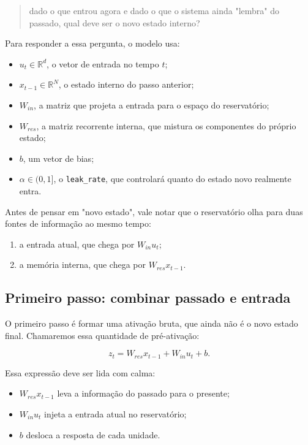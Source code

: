 \documentclass[12pt]{article}
\providecommand{\tightlist}{%
              \setlength{\itemsep}{0pt}\setlength{\parskip}{0pt}}
\begin{document}
\begin{quote}
dado o que entrou agora e dado o que o sistema ainda "lembra" do passado, qual deve ser o novo estado interno?
\end{quote}

Para responder a essa pergunta, o modelo usa:

\begin{itemize}
\tightlist
\item
  \(u_t \in \mathbb{R}^d\), o vetor de entrada no tempo \(t\);
\item
  \(x_{t-1} \in \mathbb{R}^N\), o estado interno do passo anterior;
\item
  \(W_{in}\), a matriz que projeta a entrada para o espaço do reservatório;
\item
  \(W_{res}\), a matriz recorrente interna, que mistura os componentes do próprio estado;
\item
  \(b\), um vetor de bias;
\item
  \(\alpha \in (0,1]\), o \texttt{leak\_rate}, que controlará quanto do estado novo realmente entra.
\end{itemize}

Antes de pensar em "novo estado", vale notar que o reservatório olha para duas fontes de informação ao mesmo tempo:

\begin{enumerate}
\def\labelenumi{\arabic{enumi}.}
\tightlist
\item
  a entrada atual, que chega por \(W_{in} u_t\);
\item
  a memória interna, que chega por \(W_{res} x_{t-1}\).
\end{enumerate}

\subsection{Primeiro passo: combinar passado e entrada}\label{32-primeiro-passo-combinar-passado-e-entrada}

O primeiro passo é formar uma ativação bruta, que ainda não é o novo estado final. Chamaremos essa quantidade de pré-ativação:

\[
z_t = W_{res} x_{t-1} + W_{in} u_t + b.
\]

Essa expressão deve ser lida com calma:

\begin{itemize}
\tightlist
\item
  \(W_{res} x_{t-1}\) leva a informação do passado para o presente;
\item
  \(W_{in} u_t\) injeta a entrada atual no reservatório;
\item
  \(b\) desloca a resposta de cada unidade.
\end{itemize}
\end{document}
